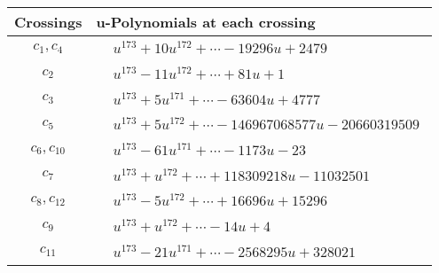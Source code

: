 \documentclass[1p]{elsarticle_modified}
\theoremstyle{definition}
\begin{document}
\begin{tabular}{m{50pt}|m{274pt}}
Crossings & \hspace{64pt}u-Polynomials at each crossing \\
\hline $$\begin{aligned}c_{1},c_{4}\end{aligned}$$&$\begin{aligned}
&u^{173}+10 u^{172}+\cdots-19296 u+2479
\end{aligned}$\\
\hline $$\begin{aligned}c_{2}\end{aligned}$$&$\begin{aligned}
&u^{173}-11 u^{172}+\cdots+81 u+1
\end{aligned}$\\
\hline $$\begin{aligned}c_{3}\end{aligned}$$&$\begin{aligned}
&u^{173}+5 u^{171}+\cdots-63604 u+4777
\end{aligned}$\\
\hline $$\begin{aligned}c_{5}\end{aligned}$$&$\begin{aligned}
&u^{173}+5 u^{172}+\cdots-146967068577 u-20660319509
\end{aligned}$\\
\hline $$\begin{aligned}c_{6},c_{10}\end{aligned}$$&$\begin{aligned}
&u^{173}-61 u^{171}+\cdots-1173 u-23
\end{aligned}$\\
\hline $$\begin{aligned}c_{7}\end{aligned}$$&$\begin{aligned}
&u^{173}+u^{172}+\cdots+118309218 u-11032501
\end{aligned}$\\
\hline $$\begin{aligned}c_{8},c_{12}\end{aligned}$$&$\begin{aligned}
&u^{173}-5 u^{172}+\cdots+16696 u+15296
\end{aligned}$\\
\hline $$\begin{aligned}c_{9}\end{aligned}$$&$\begin{aligned}
&u^{173}+u^{172}+\cdots-14 u+4
\end{aligned}$\\
\hline $$\begin{aligned}c_{11}\end{aligned}$$&$\begin{aligned}
&u^{173}-21 u^{171}+\cdots-2568295 u+328021
\end{aligned}$\\
\hline
\end{tabular}\\~\\
\end{document}
